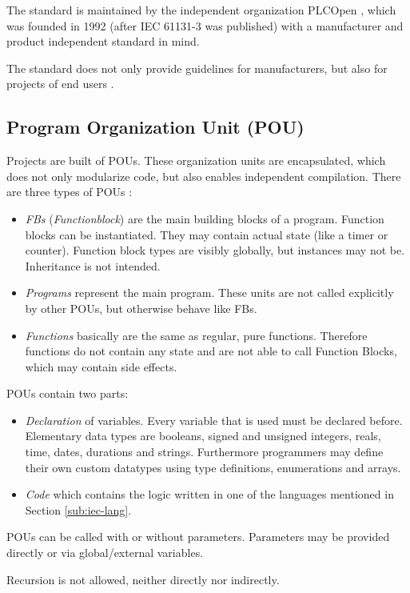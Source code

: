 The standard is maintained by the independent organization PLCOpen \cite{eldijkWhatPLCopen2018}, which was founded in 1992 (after IEC 61131-3 was published) with a manufacturer and product independent standard in mind.


The standard does not only provide guidelines for manufacturers, but also for projects of end users \cite{johnIEC611313Programming2010}.
\pagebreak
\subsection{Program Organization Unit (POU)}
\label{sub:pou}
Projects are built of POUs. These organization units are encapsulated, which does not only modularize code, but also enables independent compilation.
There are three types of POUs \cite{johnIEC611313Programming2010}:
\begin{itemize}
	\item \emph{FBs} (\emph{Functionblock}) are the main building blocks of a program. Function blocks can be instantiated. They may contain actual state (like a timer or counter). Function block types are visibly globally, but instances may not be. Inheritance is not intended.
	\item \emph{Programs} represent the main program. These units are not called explicitly by other POUs, but otherwise behave like FBs.
	\item \emph{Functions} basically are the same as regular, pure functions. Therefore functions do not contain any state and are not able to call Function Blocks, which may contain side effects. 
\end{itemize}
POUs contain two parts:
\begin{itemize}
	\item \emph{Declaration} of variables. Every variable that is used must be declared before. Elementary data types are booleans, signed and unsigned integers, reals, time, dates, durations and strings. Furthermore programmers may define their own custom datatypes using type definitions, enumerations and arrays.
	\item \emph{Code} which contains the logic written in one of the languages mentioned in Section \ref{sub:iec-lang}.
\end{itemize}
POUs can be called with or without parameters. Parameters may be provided directly or via global/external variables.

Recursion is not allowed, neither directly nor indirectly. 


